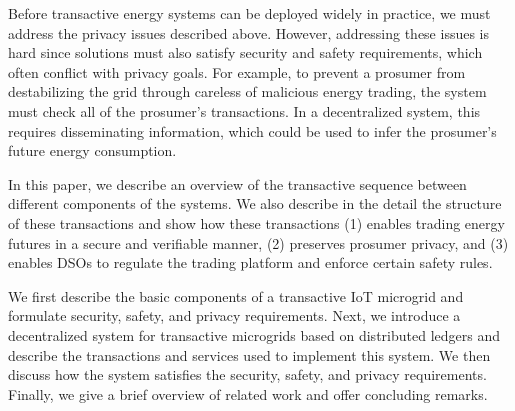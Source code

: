 Before transactive energy systems can be deployed widely in practice,
we must address the privacy issues described above. However, addressing these
issues is hard since solutions must also satisfy security
and safety requirements, which often conflict with privacy goals.  For
example, to prevent a prosumer from destabilizing the grid through
careless of malicious energy trading, the system must check all of the
prosumer's transactions.  In a decentralized system, this requires
disseminating information, which could be used to infer the prosumer's
future energy consumption.

In this paper, we describe an overview of the transactive sequence between different components of the systems. We also describe in the detail the structure of these transactions and show how these transactions  (1) enables trading energy futures in a
secure and verifiable manner, (2) preserves prosumer privacy, and (3)
enables DSOs to regulate the trading platform and enforce certain
safety rules. 


We first describe the basic components of a
transactive IoT microgrid and formulate security, safety, and privacy
requirements.  Next, we introduce a decentralized system for
transactive microgrids based on distributed ledgers and describe the
transactions and services used to implement this system.  We then
discuss how the system satisfies the security, safety, and privacy
requirements.  Finally, we give a brief overview of related work and
offer concluding remarks.


